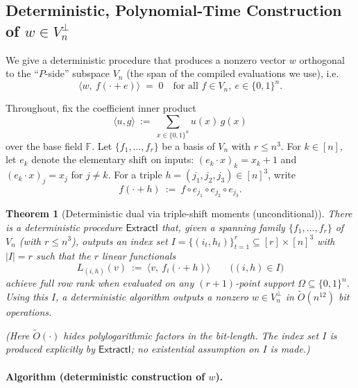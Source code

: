 \documentclass[12pt]{article}
\newtheorem{theorem}{Theorem}
\theoremstyle{definition}
\theoremstyle{definition}
\theoremstyle{remark}
\theoremstyle{remark}
\begin{document}
\subsection{Deterministic, Polynomial-Time Construction of $w \in V_n^{\perp}$}
\label{subsec:kernel-construction}

We give a deterministic procedure that produces a nonzero vector $w$ orthogonal to the ``$P$-side'' subspace $V_n$ (the span of the compiled evaluations we use), i.e.\
\[
\langle w,\ f(\cdot+e)\rangle \;=\; 0 \quad \text{for all } f\in V_n,\ e\in\{0,1\}^n.
\]

Throughout, fix the coefficient inner product
\[
\langle u,g\rangle \ :=\ \sum_{x\in\{0,1\}^n} u(x)\,g(x)
\]
over the base field $\mathbb{F}$. Let $\{f_1,\dots,f_r\}$ be a basis of $V_n$ with $r\le n^3$. For $k\in[n]$, let $e_k$ denote the elementary shift on inputs: $(e_k\cdot x)_k = x_k+1$ and $(e_k\cdot x)_j=x_j$ for $j\neq k$. For a triple $h=(j_1,j_2,j_3)\in[n]^3$, write
\[
f(\cdot+h)\ :=\ f\circ e_{j_1}\circ e_{j_2}\circ e_{j_3}.
\]

\begin{theorem}[Deterministic dual via triple-shift moments (unconditional)]
\label{thm:deterministic-dual}
There is a deterministic procedure $\mathsf{ExtractI}$ that, given a spanning family $\{f_1,\dots,f_r\}$
of $V_n$ (with $r\le n^3$), outputs an index set $I = \{(i_t,h_t)\}_{t=1}^r \subseteq [r]\times [n]^3$
with $|I|=r$ such that the $r$ linear functionals
\[
L_{(i,h)}(v) \ :=\ \langle v,\ f_i(\cdot+h)\rangle \qquad \bigl((i,h)\in I\bigr)
\]
achieve full row rank when evaluated on any $(r+1)$-point support $\Omega\subseteq\{0,1\}^n$.
Using this $I$, a deterministic algorithm outputs a nonzero $w\in V_n^{\perp}$ in $\tilde O(n^{12})$ bit operations.

(Here $\tilde O(\cdot)$ hides polylogarithmic factors in the bit-length. The index set $I$ is produced
explicitly by $\mathsf{ExtractI}$; no existential assumption on $I$ is made.)
\end{theorem}

\paragraph{Algorithm (deterministic construction of $w$).}
\end{document}
